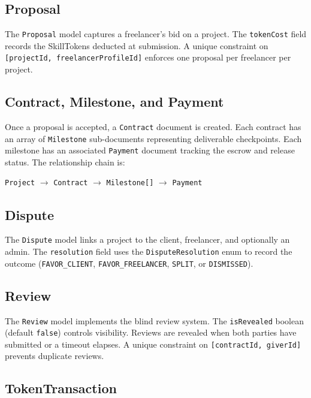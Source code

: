 \subsection{Proposal}

The \texttt{Proposal} model captures a freelancer's bid on a project. The \texttt{tokenCost} field records the SkillTokens deducted at submission. A unique constraint on \texttt{[projectId, freelancerProfileId]} enforces one proposal per freelancer per project.

\subsection{Contract, Milestone, and Payment}

Once a proposal is accepted, a \texttt{Contract} document is created. Each contract has an array of \texttt{Milestone} sub-documents representing deliverable checkpoints. Each milestone has an associated \texttt{Payment} document tracking the escrow and release status. The relationship chain is:

\begin{center}
\texttt{Project} $\rightarrow$ \texttt{Contract} $\rightarrow$ \texttt{Milestone[]} $\rightarrow$ \texttt{Payment}
\end{center}

\subsection{Dispute}

The \texttt{Dispute} model links a project to the client, freelancer, and optionally an admin. The \texttt{resolution} field uses the \texttt{DisputeResolution} enum to record the outcome (\texttt{FAVOR\_CLIENT}, \texttt{FAVOR\_FREELANCER}, \texttt{SPLIT}, or \texttt{DISMISSED}).

\subsection{Review}

The \texttt{Review} model implements the blind review system. The \texttt{isRevealed} boolean (default \texttt{false}) controls visibility. Reviews are revealed when both parties have submitted or a timeout elapses. A unique constraint on \texttt{[contractId, giverId]} prevents duplicate reviews.

\subsection{TokenTransaction}

